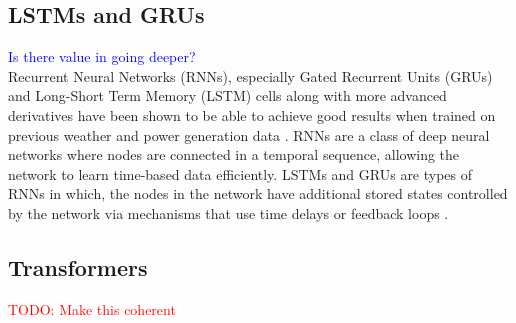 \subsection{LSTMs and GRUs}
\textcolor{blue}{Is there value in going deeper?}\\
Recurrent Neural Networks (RNNs), especially Gated Recurrent Units (GRUs) and Long-Short Term Memory (LSTM) cells \cite{Goodfellow-et-al-2016} along with more advanced derivatives have been shown to be able to achieve good results when trained on previous weather and power generation data \cite{lin_temporal_2020, lee_forecasting_2018, jaidee_very_2019, su_machine_2019}.
RNNs are a class of deep neural networks where nodes are connected in a temporal sequence, allowing the network to learn time-based data efficiently. LSTMs and GRUs are types of RNNs in which, the nodes in the network have additional stored states controlled by the network via mechanisms that use time delays or feedback loops \cite{Goodfellow-et-al-2016, noauthor_recurrent_2021}.\\




\subsection{Transformers}
 \textcolor{red}{TODO: Make this coherent}
 
